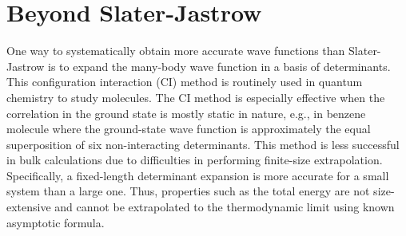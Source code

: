 \begin{comment}
For the gravitational interaction $v(r)=Gm_1m_2/r^2$, eq.~(\ref{eq:wf-cusp}) implies
\begin{align}
\lim\limits_{r\rightarrow 0} u(r) = \alpha\ln r,
\end{align}
where $\alpha$ satisfies
\begin{align}
\alpha^2 + (2-d)\alpha - G(m_1+m_2) = 0.
\end{align}
\end{comment}







\section{Beyond Slater-Jastrow}
One way to systematically obtain more accurate wave functions than Slater-Jastrow is to expand the many-body wave function in a basis of determinants. This configuration interaction (CI) method is routinely used in quantum chemistry to study molecules. The CI method is especially effective when the correlation in the ground state is mostly static in nature, e.g., in benzene molecule where the ground-state wave function is approximately the equal superposition of six non-interacting determinants. This method is less successful in bulk calculations due to difficulties in performing finite-size extrapolation. Specifically, a fixed-length determinant expansion is more accurate for a small system than a large one. Thus, properties such as the total energy are not size-extensive and cannot be extrapolated to the thermodynamic limit using known asymptotic formula.

